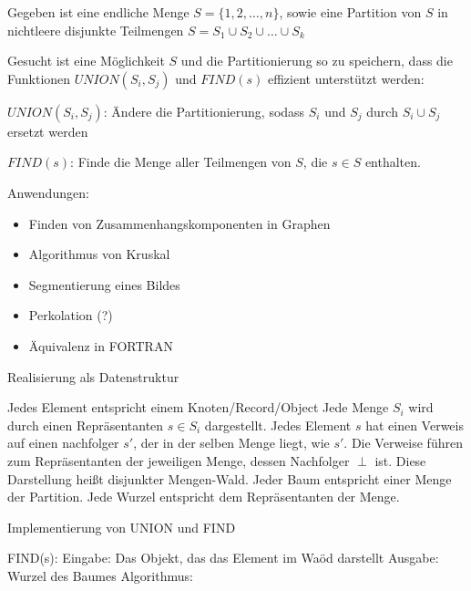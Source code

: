 Gegeben ist eine endliche Menge $S = \{1, 2, \ldots, n\}$, sowie eine Partition
von $S$ in nichtleere disjunkte Teilmengen
$S = S_1 \cup S_2 \cup \ldots \cup S_k$

Gesucht ist eine Möglichkeit $S$ und die Partitionierung so zu speichern, dass
die Funktionen $UNION(S_i, S_j)$ und $FIND(s)$ effizient unterstützt werden:

$UNION(S_i, S_j)$: Ändere die Partitionierung, sodass $S_i$ und $S_j$ durch
$S_i \cup S_j$ ersetzt werden

$FIND(s)$: Finde die Menge aller Teilmengen von $S$, die $s \in S$ enthalten.

Anwendungen:
\begin{itemize}
\item Finden von Zusammenhangskomponenten in Graphen
\item Algorithmus von Kruskal
\item Segmentierung eines Bildes
\item Perkolation (?)
\item Äquivalenz in FORTRAN
\end{itemize}

Realisierung als Datenstruktur

Jedes Element entspricht einem Knoten/Record/Object
Jede Menge $S_i$ wird durch einen Repräsentanten $s \in S_i$ dargestellt.
Jedes Element $s$ hat einen Verweis auf einen nachfolger $s'$, der in der selben
Menge liegt, wie $s'$. Die Verweise führen zum Repräsentanten der jeweiligen
Menge, dessen Nachfolger $\perp$ ist.
Diese Darstellung heißt disjunkter Mengen-Wald. Jeder Baum entspricht einer
Menge der Partition. Jede Wurzel entspricht dem Repräsentanten der Menge.

Implementierung von UNION und FIND

FIND(s): Eingabe: Das Objekt, das das Element im Waöd darstellt
Ausgabe: Wurzel des Baumes
Algorithmus: 
